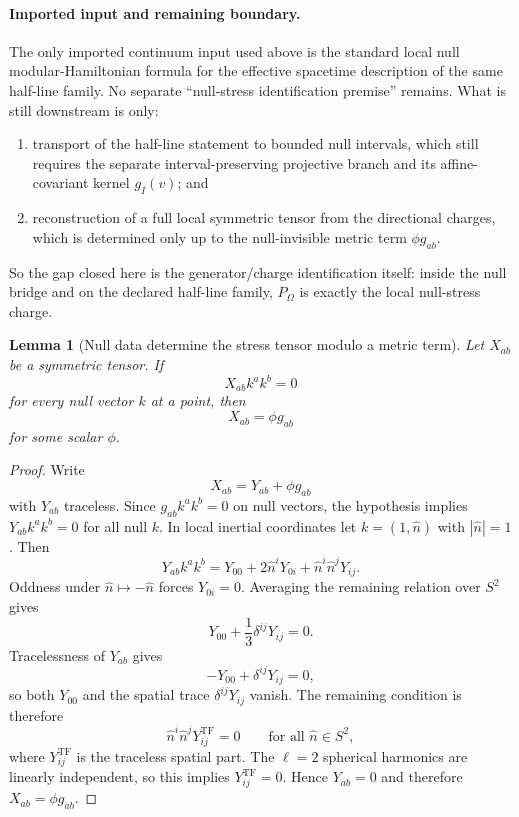 \documentclass[11pt]{article}
\newtheorem{lemma}[theorem]{Lemma}
\begin{document}
\paragraph{Imported input and remaining boundary.}
The only imported continuum input used above is the standard local null modular-Hamiltonian formula for the effective spacetime description of the same half-line family. No separate ``null-stress identification premise'' remains. What is still downstream is only:
\begin{enumerate}[label=(\roman*),leftmargin=2.2em]
\item transport of the half-line statement to bounded null intervals, which still requires the separate interval-preserving projective branch and its affine-covariant kernel \(g_I(v)\); and
\item reconstruction of a full local symmetric tensor from the directional charges, which is determined only up to the null-invisible metric term \(\phi g_{ab}\).
\end{enumerate}
So the gap closed here is the generator/charge identification itself: inside the null bridge and on the declared half-line family, \(P_\Omega\) is exactly the local null-stress charge.

\begin{lemma}[Null data determine the stress tensor modulo a metric term]\label{lem:nullreconstruct}
Let \(X_{ab}\) be a symmetric tensor. If
\[
X_{ab}k^ak^b=0
\]
for every null vector \(k\) at a point, then
\[
X_{ab}=\phi g_{ab}
\]
for some scalar \(\phi\).
\end{lemma}

\begin{proof}
Write
\[
X_{ab}=Y_{ab}+\phi g_{ab}
\]
with \(Y_{ab}\) traceless. Since \(g_{ab}k^ak^b=0\) on null vectors, the hypothesis implies \(Y_{ab}k^ak^b=0\) for all null \(k\). In local inertial coordinates let \(k=(1,\hat n)\) with \(|\hat n|=1\). Then
\[
Y_{ab}k^ak^b
=
Y_{00}+2\hat n^iY_{0i}+\hat n^i\hat n^jY_{ij}.
\]
Oddness under \(\hat n\mapsto-\hat n\) forces \(Y_{0i}=0\). Averaging the remaining relation over \(S^2\) gives
\[
Y_{00}+\frac13\delta^{ij}Y_{ij}=0.
\]
Tracelessness of \(Y_{ab}\) gives
\[
-Y_{00}+\delta^{ij}Y_{ij}=0,
\]
so both \(Y_{00}\) and the spatial trace \(\delta^{ij}Y_{ij}\) vanish. The remaining condition is therefore
\[
\hat n^i\hat n^j Y_{ij}^{\mathrm{TF}}=0
\qquad
\text{for all }\hat n\in S^2,
\]
where \(Y_{ij}^{\mathrm{TF}}\) is the traceless spatial part. The \(\ell=2\) spherical harmonics are linearly independent, so this implies \(Y_{ij}^{\mathrm{TF}}=0\). Hence \(Y_{ab}=0\) and therefore \(X_{ab}=\phi g_{ab}\).
\end{proof}
\end{document}
